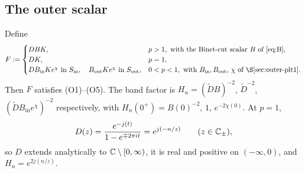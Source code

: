 \subsection{The outer scalar}\label{sec:outer-scalar}

\begin{lemma}\label{lem:outer}
Define
\[
  F:=\begin{cases}DBK,&p>1,\ \text{with the Binet-cut scalar $B$ of~\eqref{eq:B}},\\
  DK,&p=1,\\
  DB_{\mathrm{in}}Ke^{\chi}\ \text{in }\Sin,\quad B_{\mathrm{out}}Ke^{\chi}\ \text{in }\Sout,&0<p<1,\ \text{with $B_{\mathrm{in}},B_{\mathrm{out}}$, $\chi$ of \S\ref{sec:outer-plt1}}.
  \end{cases}
\]
Then $F$ satisfies (O1)--(O5). The band factor is $H_n=(\tilde DB)^{-2}$, $\tilde D^{-2}$, $(\tilde DB_{\mathrm{in}}e^{\chi})^{-2}$
respectively, with $H_n(0^+)=B(0)^{-2}$, $1$, $e^{-2\chi(0)}$. At $p=1$,
\begin{equation}\label{eq:reflection}
  D(z)=\frac{e^{-j(t)}}{1-e^{\mp2\pi it}}=e^{j(-n/z)}\qquad(z\in\mathbb{C}_\pm),
\end{equation}
so $D$ extends analytically to $\mathbb{C}\setminus[0,\infty)$, it is real and positive on $(-\infty,0)$, and $H_n=e^{2j(n/z)}$.
\end{lemma}

